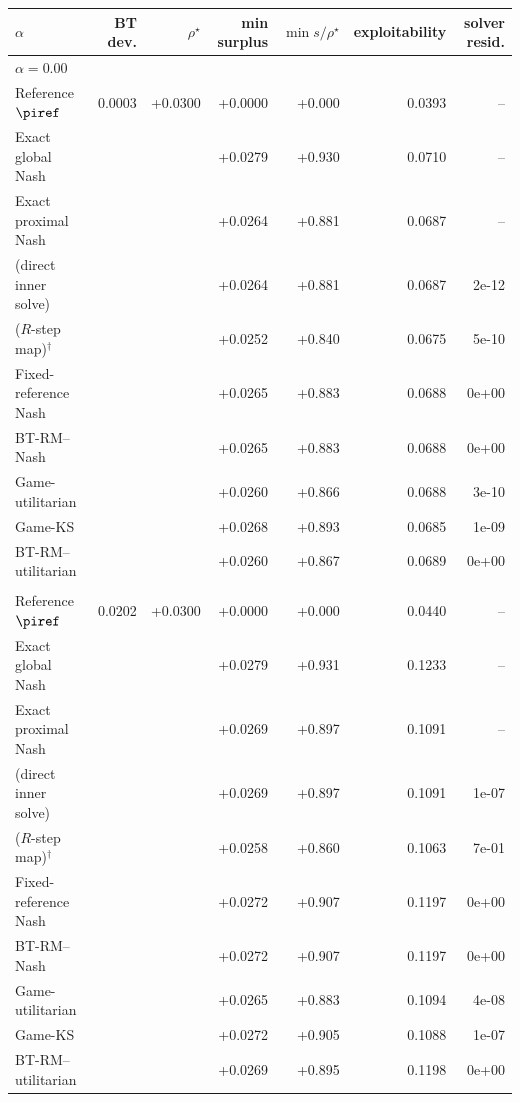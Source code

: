 \begin{tabular}{l r r r r r r}
\toprule
$\alpha$ & BT dev. & $\rho^\star$ & min surplus & $\min s/\rho^\star$ & exploitability & solver resid. \\
\midrule
\multicolumn{7}{l}{\textit{$\alpha=0.00$}} \\
\quad Reference $\piref$ & 0.0003 & +0.0300 & +0.0000 & +0.000 & 0.0393 & -- \\
\quad Exact global Nash &  &  & +0.0279 & +0.930 & 0.0710 & -- \\
\quad Exact proximal Nash &  &  & +0.0264 & +0.881 & 0.0687 & -- \\
\quad \NBPO{} (direct inner solve) &  &  & +0.0264 & +0.881 & 0.0687 & 2e-12 \\
\quad \NBPO{} ($R$-step map)$^{\dagger}$ &  &  & +0.0252 & +0.840 & 0.0675 & 5e-10 \\
\quad Fixed-reference Nash &  &  & +0.0265 & +0.883 & 0.0688 & 0e+00 \\
\quad BT-RM--Nash &  &  & +0.0265 & +0.883 & 0.0688 & 0e+00 \\
\quad Game-utilitarian &  &  & +0.0260 & +0.866 & 0.0688 & 3e-10 \\
\quad Game-KS &  &  & +0.0268 & +0.893 & 0.0685 & 1e-09 \\
\quad BT-RM--utilitarian &  &  & +0.0260 & +0.867 & 0.0689 & 0e+00 \\
\addlinespace
\multicolumn{7}{l}{\textit{$\alpha=0.25$}} \\
\quad Reference $\piref$ & 0.0202 & +0.0300 & +0.0000 & +0.000 & 0.0440 & -- \\
\quad Exact global Nash &  &  & +0.0279 & +0.931 & 0.1233 & -- \\
\quad Exact proximal Nash &  &  & +0.0269 & +0.897 & 0.1091 & -- \\
\quad \NBPO{} (direct inner solve) &  &  & +0.0269 & +0.897 & 0.1091 & 1e-07 \\
\quad \NBPO{} ($R$-step map)$^{\dagger}$ &  &  & +0.0258 & +0.860 & 0.1063 & 7e-01 \\
\quad Fixed-reference Nash &  &  & +0.0272 & +0.907 & 0.1197 & 0e+00 \\
\quad BT-RM--Nash &  &  & +0.0272 & +0.907 & 0.1197 & 0e+00 \\
\quad Game-utilitarian &  &  & +0.0265 & +0.883 & 0.1094 & 4e-08 \\
\quad Game-KS &  &  & +0.0272 & +0.905 & 0.1088 & 1e-07 \\
\quad BT-RM--utilitarian &  &  & +0.0269 & +0.895 & 0.1198 & 0e+00 \\

\end{tabular}
